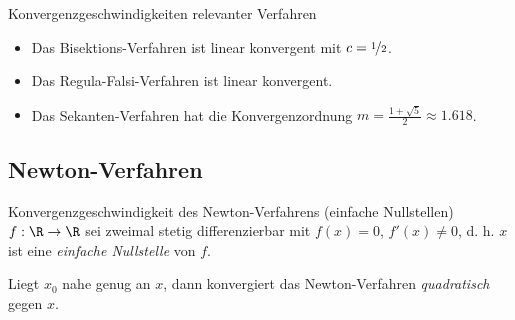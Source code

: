 \begin{bonus}{Konvergenzgeschwindigkeiten relevanter Verfahren}
    \begin{itemize}
        \item Das Bisektions-Verfahren ist linear konvergent mit $c = \nicefrac{1}{2}$.
        \item Das Regula-Falsi-Verfahren ist linear konvergent.
        \item Das Sekanten-Verfahren hat die Konvergenzordnung $m = \frac{1 + \sqrt{5}}{2} \approx 1.618$.
    \end{itemize}
\end{bonus}

\subsection{Newton-Verfahren}

\begin{defi}{Konvergenzgeschwindigkeit des Newton-Verfahrens (einfache Nullstellen)}
    $f: \R \to \R$ sei zweimal stetig differenzierbar mit $f(x) = 0$, $f'(x) \neq 0$, d. h. $x$ ist eine \emph{einfache Nullstelle} von $f$. 
    
    Liegt $x_0$ nahe genug an $x$, dann konvergiert das Newton-Verfahren \emph{quadratisch} gegen $x$.
\end{defi}

